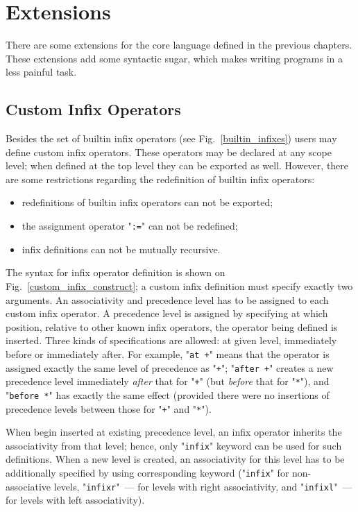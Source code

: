 \chapter{Extensions}
\label{sec:extensions}

There are some extensions for the core language defined in the previous chapters. These
extensions add some syntactic sugar, which makes writing programs in \lama a less
painful task.

\section{Custom Infix Operators}
\label{sec:custom_infix}

Besides the set of builtin infix operators (see Fig.~\ref{builtin_infixes}) users may define
custom infix operators. These operators may be declared at any scope level; when defined
at the top level they can be exported as well. However, there are some restrictions regarding the
redefinition of builtin infix operators:

\begin{itemize}
\item redefinitions of builtin infix operators can not be exported;
\item the assignment operator "\lstinline|:=|" can not be redefined;
\item infix definitions can not be mutually recursive.
\end{itemize}

The syntax for infix operator definition is shown on Fig.~\ref{custom_infix_construct}; a custom infix definition must specify exactly two arguments.
An associativity and precedence level has to be assigned to each custom infix operator. A precedence level is assigned by specifying at which
position, relative to other known infix operators, the operator being defined is inserted. Three kinds of specifications are allowed: at given level,
immediately before or immediately after. For example, "\lstinline|at +|" means that the operator is assigned exactly the same
level of precedence as "\lstinline|+|"; "\lstinline|after +|" creates a new precedence level immediately \emph{after} that for
"\lstinline|+|" (but \emph{before} that for "\lstinline|*|"), and "\lstinline|before *|" has exactly the same effect (provided
there were no insertions of precedence levels between those for "\lstinline|+|" and "\lstinline|*|").

When begin inserted at existing precedence level, an infix operator inherits the associativity from that level; hence, only "\lstinline|infix|"
keyword can be used for such definitions. When a new level is created, an associativity for this level has to be additionally specified
by using corresponding keyword ("\lstinline|infix|" for non-associative levels, "\lstinline|infixr|"~--- for levels with right
associativity, and "\lstinline|infixl|"~--- for levels with left associativity).

